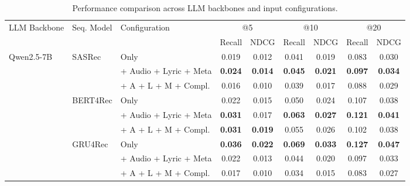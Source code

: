 \begin{table}[t]
\centering
\small
\setlength{\tabcolsep}{5pt}
\caption{Performance comparison across LLM backbones and input configurations.   }
\label{tab:experiment_results2}
\begin{tabular}{lllcccccc}
\toprule
\multirow{2}{*}{LLM Backbone}
& \multirow{2}{*}{Seq. Model}
& \multirow{2}{*}{Configuration}
& \multicolumn{2}{c}{@5}
& \multicolumn{2}{c}{@10}
& \multicolumn{2}{c}{@20} \\
\cmidrule(lr){4-5} \cmidrule(lr){6-7} \cmidrule(lr){8-9}
& & & Recall & NDCG & Recall & NDCG & Recall & NDCG \\
\midrule

\multirow{9}{*}{Qwen2.5-7B}
& \multirow{3}{*}{SASRec}
  & Only                    & 0.019 & 0.012 & 0.041 & 0.019 & 0.083 & 0.030 \\
& & + Audio + Lyric + Meta  & \textbf{0.024} & \textbf{0.014} & \textbf{0.045} & \textbf{0.021} & \textbf{0.097} & \textbf{0.034} \\
& & + A + L + M + Compl.    & 0.016 & 0.010 & 0.039 & 0.017 & 0.088 & 0.029 \\
\cmidrule(lr){2-9}
& \multirow{3}{*}{BERT4Rec}
  & Only                    & 0.022 & 0.015 & 0.050 & 0.024 & 0.107 & 0.038 \\
& & + Audio + Lyric + Meta  & \textbf{0.031} & 0.017 & \textbf{0.063} & \textbf{0.027} & \textbf{0.121} & \textbf{0.041} \\
& & + A + L + M + Compl.    & \textbf{0.031} & \textbf{0.019} & 0.055 & 0.026 & 0.102 & 0.038 \\
\cmidrule(lr){2-9}
& \multirow{3}{*}{GRU4Rec}
  & Only                    & \textbf{0.036} & \textbf{0.022} & \textbf{0.069} & \textbf{0.033} & \textbf{0.127} & \textbf{0.047} \\
& & + Audio + Lyric + Meta  & 0.022 & 0.013 & 0.044 & 0.020 & 0.097 & 0.033 \\
& & + A + L + M + Compl.    & 0.017 & 0.010 & 0.034 & 0.015 & 0.083 & 0.027 \\
\midrule


\end{tabular}
\end{table}
